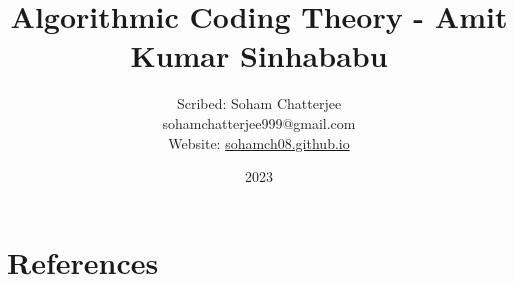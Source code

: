 \documentclass{report}
\title{\huge Algorithmic Coding Theory - Amit Kumar Sinhababu}
\author{ \vspace*{5mm} \LARGE Scribed: Soham Chatterjee\\\large sohamchatterjee999@gmail.com\\ \large Website: \href{https://sohamch08.github.io/}{sohamch08.github.io}}
\date{\LARGE 2023}
\begin{document}
\begin{titlingpage}
	\maketitle
\end{titlingpage}
	
\pagebreak
\tableofcontents 
\pagebreak







\pagebreak
\chapter{References}
\printbibliography[heading=none]
%
%
\end{document}
